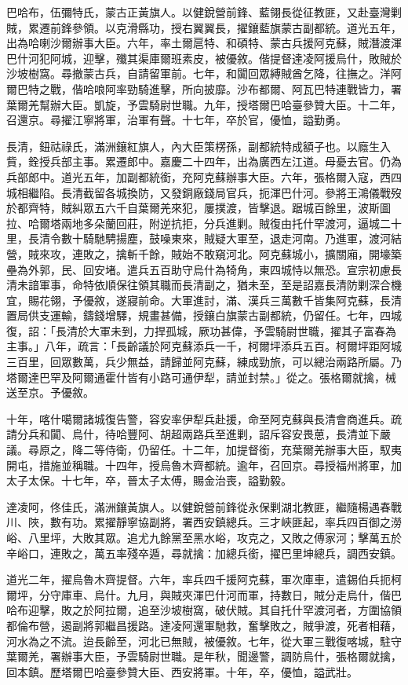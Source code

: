 \begin{pinyinscope}
巴哈布，伍彌特氏，蒙古正黃旗人。以健銳營前鋒、藍翎長從征教匪，又赴臺灣剿賊，累遷前鋒參領。以克滑縣功，授右翼翼長，擢鑲藍旗蒙古副都統。道光五年，出為哈喇沙爾辦事大臣。六年，率土爾扈特、和碩特、蒙古兵援阿克蘇，賊潛渡渾巴什河犯阿城，迎擊，殲其渠庫爾班素皮，被優敘。偕提督達凌阿援烏什，敗賊於沙坡樹窩。尋撤蒙古兵，自請留軍前。七年，和闐回眾縛賊酋乞降，往撫之。洋阿爾巴特之戰，偕哈哴阿率勁騎進擊，所向披靡。沙布都爾、阿瓦巴特連戰皆力，署葉爾羌幫辦大臣。凱旋，予雲騎尉世職。九年，授塔爾巴哈臺參贊大臣。十二年，召還京。尋擢江寧將軍，治軍有聲。十七年，卒於官，優恤，謚勤勇。

長清，鈕祜祿氏，滿洲鑲紅旗人，內大臣策楞孫，副都統特成額子也。以廕生入貲，銓授兵部主事。累遷郎中。嘉慶二十四年，出為廣西左江道。母憂去官。仍為兵部郎中。道光五年，加副都統銜，充阿克蘇辦事大臣。六年，張格爾入寇，西四城相繼陷。長清截留各城換防，又發銅廠錢局官兵，扼渾巴什河。參將王鴻儀戰歿於都齊特，賊糾眾五六千自葉爾羌來犯，屢撲渡，皆擊退。踞城百餘里，波斯圖拉、哈爾塔兩地多朵蘭回莊，附逆抗拒，分兵進剿。賊復由托什罕渡河，逼城二十里，長清令數十騎馳騁揚塵，鼓噪東來，賊疑大軍至，退走河南。乃進軍，渡河結營，賊來攻，連敗之，擒斬千餘，賊始不敢窺河北。阿克蘇城小，擴關廂，開壕築壘為外郭，民、回安堵。遣兵五百助守烏什為犄角，東四城恃以無恐。宣宗初慮長清未諳軍事，命特依順保往領其職而長清副之，猶未至，至是詔嘉長清防剿深合機宜，賜花翎，予優敘，遂寢前命。大軍進討，滿、漢兵三萬數千皆集阿克蘇，長清置局供支運輸，鑄錢增驛，規畫甚備，授鑲白旗蒙古副都統，仍留任。七年，四城復，詔：「長清於大軍未到，力捍孤城，厥功甚偉，予雲騎尉世職，擢其子富春為主事。」八年，疏言：「長齡議於阿克蘇添兵一千，柯爾坪添兵五百。柯爾坪距阿城三百里，回眾數萬，兵少無益，請歸並阿克蘇，練成勁旅，可以總治兩路所屬。乃塔爾達巴罕及阿爾通霍什皆有小路可通伊犁，請並封禁。」從之。張格爾就擒，械送至京。予優敘。

十年，喀什噶爾諸城復告警，容安率伊犁兵赴援，命至阿克蘇與長清會商進兵。疏請分兵和闐、烏什，待哈豐阿、胡超兩路兵至進剿，詔斥容安畏葸，長清並下嚴議。尋原之，降二等侍衛，仍留任。十二年，加提督銜，充葉爾羌辦事大臣，馭夷開屯，措施並稱職。十四年，授烏魯木齊都統。逾年，召回京。尋授福州將軍，加太子太保。十七年，卒，晉太子太傅，賜金治喪，謚勤毅。

達凌阿，佟佳氏，滿洲鑲黃旗人。以健銳營前鋒從永保剿湖北教匪，繼隨楊遇春戰川、陜，數有功。累擢靜寧協副將，署西安鎮總兵。三才峽匪起，率兵四百御之澇峪、八里坪，大敗其眾。追尤九餘黨至黑水峪，攻克之，又敗之傅家河；擊萬五於辛峪口，連敗之，萬五率殘卒遁，尋就擒：加總兵銜，擢巴里坤總兵，調西安鎮。

道光二年，擢烏魯木齊提督。六年，率兵四千援阿克蘇，軍次庫車，遣錫伯兵扼柯爾坪，分守庫車、烏什。九月，與賊夾渾巴什河而軍，持數日，賊分走烏什，偕巴哈布迎擊，敗之於阿拉爾，追至沙坡樹窩，破伏賊。其自托什罕渡河者，方圍協領都倫布營，遏副將郭繼昌援路。達凌阿還軍馳救，奮擊敗之，賊爭渡，死者相藉，河水為之不流。迨長齡至，河北已無賊，被優敘。七年，從大軍三戰復喀城，駐守葉爾羌，署辦事大臣，予雲騎尉世職。是年秋，聞邊警，調防烏什，張格爾就擒，回本鎮。歷塔爾巴哈臺參贊大臣、西安將軍。十年，卒，優恤，謚武壯。


\end{pinyinscope}
